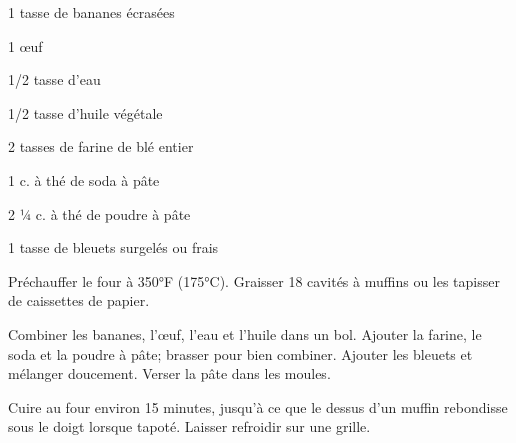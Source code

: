 


\totaltime{}


\begin{ingredients}
    \item 1 tasse de bananes écrasées
    \item 1 œuf
    \item 1/2 tasse d’eau
    \item 1/2 tasse d’huile végétale
    \item 2 tasses de farine de blé entier
    \item 1 c. à thé de soda à pâte
    \item 2 ¼ c. à thé de poudre à pâte
    \item 1 tasse de bleuets surgelés ou frais
\end{ingredients}

\begin{steps}
    \item Préchauffer le four à 350°F (175°C). Graisser 18 cavités à muffins ou les tapisser de caissettes de papier.
    \item Combiner les bananes, l’œuf, l'eau et l’huile dans un bol. Ajouter la farine, le soda et la poudre à pâte; brasser pour bien combiner. Ajouter les bleuets et mélanger doucement. Verser la pâte dans les moules.
    \item Cuire au four environ 15 minutes, jusqu’à ce que le dessus d’un muffin rebondisse sous le doigt lorsque tapoté. Laisser refroidir sur une grille.
\end{steps}
